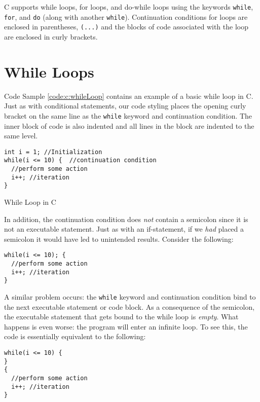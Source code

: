 

C supports while loops, for loops, and do-while loops using the keywords
\texttt{while}, \texttt{for}, and \texttt{do} (along with 
another \texttt{while}).  Continuation conditions for loops are 
enclosed in parentheses, \texttt{(...)} and the blocks of code
associated with the loop are enclosed in curly brackets.  

\section{While Loops}

Code Sample \ref{code:c:whileLoop} contains an example of a basic
while loop in C.  Just as with conditional statements, our code styling
places the opening curly bracket on the same line as the \texttt{while}
keyword and continuation condition.  The inner block of code is also
indented and all lines in the block are indented to the same level.

\begin{listing}
\begin{verbatim}
int i = 1; //Initialization
while(i <= 10) {  //continuation condition
  //perform some action
  i++; //iteration
}
\end{verbatim}
  \caption{While Loop in C}
  \label{code:c:whileLoop}
\end{listing}

In addition, the continuation condition does \emph{not} contain 
a semicolon since it is not an executable statement.  Just as with
an if-statement, if we \emph{had} placed a semicolon it would 
have led to unintended results.  Consider the following:

\begin{verbatim}
while(i <= 10); {
  //perform some action
  i++; //iteration
}
\end{verbatim}

A similar problem occurs: the \texttt{while} keyword and
continuation condition bind to the next executable statement or
code block.  As a consequence of the semicolon, the executable
statement that gets bound to the while loop is \emph{empty}.  What
happens is even worse: the program will enter an infinite loop.  To
see this, the code is essentially equivalent to the following:

\begin{verbatim}
while(i <= 10) {
}
{
  //perform some action
  i++; //iteration
}
\end{verbatim}

